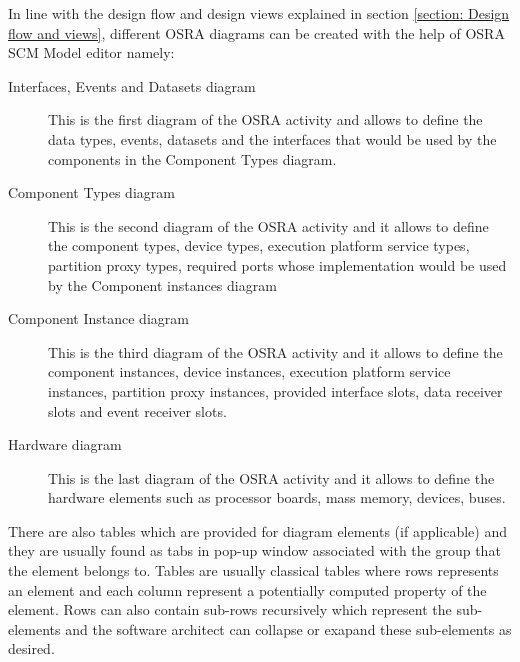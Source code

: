In line with the design flow and design views explained in section \cref{section: Design flow and views}, different OSRA diagrams can be created with the help of OSRA SCM Model editor namely:
\begin{description}
\item [Interfaces, Events and Datasets diagram] This is the first diagram of the OSRA activity and allows to define the data types, events, datasets and the interfaces that would be used by the components in the Component Types diagram.
\item [Component Types diagram] This is the second diagram of the OSRA activity and it allows to define the component types, device types, execution platform service types, partition proxy types, required ports whose implementation would be used by the Component instances diagram
\item [Component Instance diagram] This is the third diagram of the OSRA activity and it allows to define the component instances, device instances, execution platform service instances, partition proxy instances, provided interface slots, data receiver slots and event receiver slots.
\item [Hardware diagram] This is the last diagram of the OSRA activity and it allows to define the hardware elements such as processor boards, mass memory, devices, buses.
\end{description}

There are also tables which are provided for diagram elements (if applicable) and they are usually found as tabs in pop-up window associated with the group that the element belongs to. Tables are usually classical tables where rows represents an element and each column represent a potentially computed property of the element. Rows can also contain sub-rows recursively which represent the sub-elements and the software architect can collapse or exapand these sub-elements as desired.    
    

  